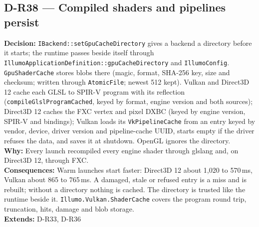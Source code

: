 \subsection*{D-R38 --- Compiled shaders and pipelines persist}
\begin{decisionbox}[title={D-R38 \quad 2026-10-03}]
\textbf{Decision:} \texttt{IBackend::setGpuCacheDirectory} gives a backend a
directory before it starts; the runtime passes  beside
itself through \texttt{IllumoApplicationDefinition::gpuCacheDirectory} and
\texttt{IllumoConfig}. \texttt{GpuShaderCache} stores blobs there (magic,
format, SHA-256 key, size and checksum; written through \texttt{AtomicFile};
newest 512 kept). Vulkan and Direct3D 12 cache each GLSL to SPIR-V program
with its reflection (\texttt{compileGlslProgramCached}, keyed by format,
engine version and both sources); Direct3D 12 caches the FXC vertex and pixel
DXBC (keyed by engine version, SPIR-V and bindings); Vulkan loads its
\texttt{VkPipelineCache} from an entry keyed by vendor, device, driver version
and pipeline-cache UUID, starts empty if the driver refuses the data, and
saves it at shutdown. OpenGL ignores the directory.\\
\textbf{Why:} Every launch recompiled every engine shader through glslang
and, on Direct3D 12, through FXC.\\
\textbf{Consequences:} Warm launches start faster: Direct3D 12 about 1,020 to
570\,ms, Vulkan about 865 to 765\,ms. A damaged, stale or refused entry is a
miss and is rebuilt; without a directory nothing is cached. The directory is
trusted like the runtime beside it. \texttt{Illumo.Vulkan.ShaderCache} covers
the program round trip, truncation, hits, damage and blob storage.\\
\textbf{Extends:} D-R33, D-R36
\end{decisionbox}

